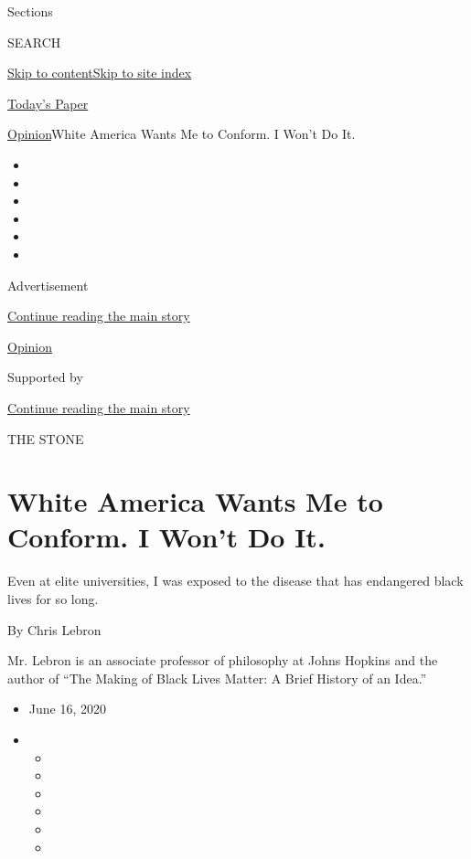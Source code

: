 Sections

SEARCH

\protect\hyperlink{site-content}{Skip to
content}\protect\hyperlink{site-index}{Skip to site index}

\href{https://myaccount.nytimes3xbfgragh.onion/auth/login?response_type=cookie\&client_id=vi}{}

\href{https://www.nytimes3xbfgragh.onion/section/todayspaper}{Today's
Paper}

\href{/section/opinion}{Opinion}\textbar{}White America Wants Me to
Conform. I Won't Do It.

\begin{itemize}
\item
\item
\item
\item
\item
\item
\end{itemize}

Advertisement

\protect\hyperlink{after-top}{Continue reading the main story}

\href{/section/opinion}{Opinion}

Supported by

\protect\hyperlink{after-sponsor}{Continue reading the main story}

THE STONE

\hypertarget{white-america-wants-me-to-conform-i-wont-do-it}{%
\section{White America Wants Me to Conform. I Won't Do
It.}\label{white-america-wants-me-to-conform-i-wont-do-it}}

Even at elite universities, I was exposed to the disease that has
endangered black lives for so long.

By Chris Lebron

Mr. Lebron is an associate professor of philosophy at Johns Hopkins and
the author of ``The Making of Black Lives Matter: A Brief History of an
Idea.''

\begin{itemize}
\item
  June 16, 2020
\item
  \begin{itemize}
  \item
  \item
  \item
  \item
  \item
  \item
  \end{itemize}
\end{itemize}


